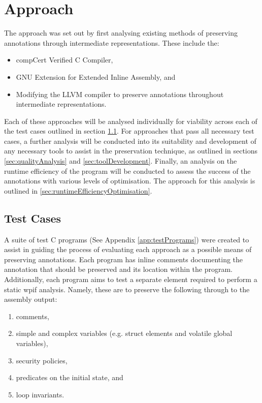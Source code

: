 \chapter{Approach}
The approach was set out by first analysing existing methods of preserving annotations through intermediate representations. These include the:
\begin{itemize}
    \item compCert Verified C Compiler, 
    \item GNU Extension for Extended Inline Assembly, and
    \item Modifying the LLVM compiler to preserve annotations throughout intermediate representations.
\end{itemize}

Each of these approaches will be analysed individually for viability across each of the test cases outlined in section \ref{sec:testCases}. For approaches that pass all necessary test cases, a further analysis will be conducted into its suitability and development of any necessary tools to assist in the preservation technique, as outlined in sections \ref{sec:qualityAnalysis} and \ref{sec:toolDevelopment}. Finally, an analysis on the runtime efficiency of the program will be conducted to assess the success of the annotations with various levels of optimisation. The approach for this analysis is outlined in \ref{sec:runtimeEfficiencyOptimisation}.

\section{Test Cases}
\label{sec:testCases}
A suite of test C programs (See Appendix \ref{app:testPrograms}) were created to assist in guiding the process of evaluating each approach as a possible means of preserving annotations. Each program has inline comments documenting the annotation that should be preserved and its location within the program. Additionally, each program aims to test a separate element required to perform a static wpif analysis. Namely, these are to preserve the following through to the assembly output:

\begin{enumerate}
    \item comments,
    \item simple and complex variables (e.g. struct elements and volatile global variables),
    \item security policies,
    \item predicates on the initial state, and
    \item loop invariants.
\end{enumerate}

